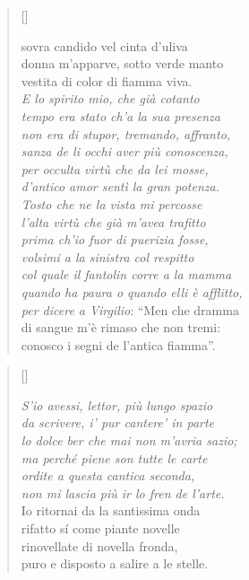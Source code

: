 \documentclass{article}
\begin{document}
\begin{verse}[\versewidth]
  \begin{patverse*}
    sovra candido vel cinta d'uliva\\
    donna m'apparve, sotto verde manto\\
    vestita di color di fiamma viva.\\
    \emph{E lo spirito mio, che già cotanto\\
    tempo era stato ch'a la sua presenza\\
    non era di stupor, tremando, affranto,\\
    sanza de li occhi aver più conoscenza,\\
    per occulta virtù che da lei mosse,\\
    d'antico amor sentì la gran potenza.\\
    Tosto che ne la vista mi percosse\\
    l'alta virtù che già m'avea trafitto\\
    prima ch'io fuor di puerizia fosse,\\
    volsimi a la sinistra col respitto\\
    col quale il fantolin corre a la mamma\\
    quando ha paura o quando elli è afflitto,\\
    per dicere a Virgilio}: ``Men che dramma\\
    di sangue m'è rimaso che non tremi:\\
    conosco i segni de l'antica fiamma''.
  \end{patverse*}
\end{verse}

\begin{verse}[\versewidth]
  \begin{patverse*}
    \emph{S'io avessi, lettor, più lungo spazio\\
    da scrivere, i' pur cantere' in parte\\
    lo dolce ber che mai non m'avria sazio;\\
    ma perché piene son tutte le carte\\
    ordite a questa cantica seconda,\\
    non mi lascia più ir lo fren de l'arte.}\\
    Io ritornai da la santissima onda\\
    rifatto sí come piante novelle\\
    rinovellate di novella fronda,\\
    puro e disposto a salire a le stelle.
  \end{patverse*}
\end{verse}
\end{document}
